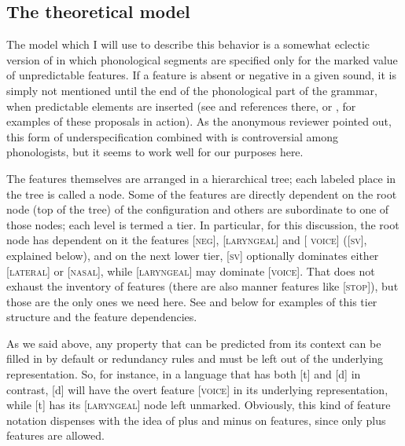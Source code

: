 \documentclass[output=paper]{LSP/langsci}
\begin{document}
\subsection{The theoretical model}

The model which I will use to describe this behavior is a somewhat eclectic version of  in which phonological segments are specified only for the marked value of unpredictable features. If a feature is absent or negative in a given sound, it is simply not mentioned until the end of the phonological part of the grammar, when predictable elements are inserted (see \citet{Rice1993} and references there, or \citet{Botma2011}, for examples of these proposals in action). As the anonymous reviewer pointed out, this form of underspecification combined with  is controversial among phonologists, but it seems to work well for our purposes here.

The features themselves are arranged in a hierarchical tree; each labeled place in the tree is called a node. Some of the features are directly dependent on the root node (top of the tree) of the configuration and others are subordinate to one of those nodes; each level is termed a tier. In particular, for this  discussion, the root node has dependent on it the features [\textsc{neg}], [\textsc{laryngeal}] and [\textsc{ voice}] ([\textsc{sv}], explained below), and on the next lower tier, [\textsc{sv}] optionally dominates either [\textsc{lateral}] or [\textsc{nasal}], while [\textsc{laryngeal}] may dominate [\textsc{voice}]. That does not exhaust the inventory of features (there are also manner features like [\textsc{stop}]), but those are the only ones we need here. See  and  below for examples of this tier structure and the feature dependencies.

As we said above, any property that can be predicted from its context can be filled in by default or redundancy rules and must be left out of the underlying representation. So, for instance, in a language that has both [t] and [d] in contrast, [d] will have the overt feature [\textsc{voice}] in its underlying representation, while [t] has its [\textsc{laryngeal}] node left unmarked. Obviously, this kind of feature notation dispenses with the idea of plus and minus on features, since only plus features are allowed.
\end{document}

